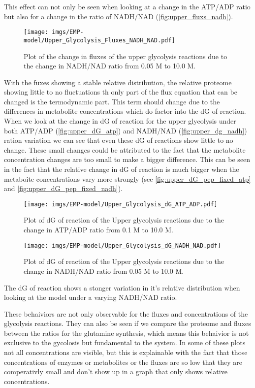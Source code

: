 This effect can not only be seen when looking at a change in the ATP/ADP ratio but also for a change in the ratio of NADH/NAD (\ref{fig:upper_fluxs_nadh}).
\begin{figure}[H]
    \centering
    \texttt{[image: imgs/EMP-model/Upper\_Glycolysis\_Fluxes\_NADH\_NAD.pdf]}
    \caption{Plot of the change in fluxes of the upper glycolysis reactions due to the change in NADH/NAD ratio from 0.05 M to 10.0 M.}
    \label{fig:upper_fluxes_nadh}
\end{figure}

With the fuxes showing a stable relative distribution, the relative proteome showing little to no fluctuations th only part of the flux equation that can be changed is the termodynamic part. This term should change due to the differences in metabolite concentrations which do factor into the dG of reaction. 
When we look at the change in dG of reaction for the upper glycolysis under both ATP/ADP (\ref{fig:upper_dG_atp}) and NADH/NAD (\ref{fig:upper_dg_nadh}) ration variation we can see that even these dG of reactions show little to no change. These small changes could be attributed to the fact that the metabolite concentration changes are too small to make a bigger difference. This can be seen in the fact that the relative change in dG of reaction is much bigger when the metaboite concentrations vary more strongly (see \ref{fig:upper_dG_pep_fixed_atp} and \ref{fig:upper_dG_pep_fixed_nadh}).
\begin{figure}[H]
    \centering
    \texttt{[image: imgs/EMP-model/Upper\_Glycolysis\_dG\_ATP\_ADP.pdf]}
    \caption{Plot of dG of reaction of the Upper glycolysis reactions due to the change in ATP/ADP ratio from 0.1 M to 10.0 M.}
    \label{fig:Upper_dG_atp}
\end{figure}

\begin{figure}[H]
    \centering
    \texttt{[image: imgs/EMP-model/Upper\_Glycolysis\_dG\_NADH\_NAD.pdf]}
    \caption{Plot of dG of reaction of the Upper glycolysis reactions due to the change in NADH/NAD ratio from 0.05 M to 10.0 M.}
    \label{fig:Upper_dG_nadh}
\end{figure}

The dG of reaction shows a stonger variation in it's relative distribution when looking at the model under a varying NADH/NAD ratio. 

These behaiviors are not only observable for the fluxes and concentrations of the glycolysis reactions. They can also be seen if we compare the proteome and fluxes between the ratios for the glutamine synthesis, which means this behaivior is not exclusive to the gycolosis but fundamental to the system.
In some of these plots not all concentrations are visible, but this is explainable with the fact that those concentrations of enzymes or metabolites or the fluxes are so low that they are comperativly small and don't show up in a graph that only shows relative concentrations.

